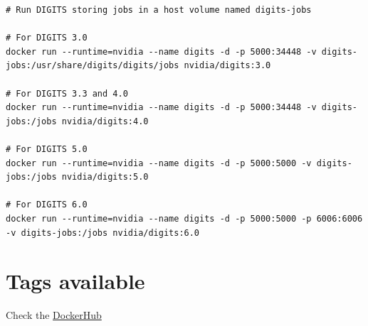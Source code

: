 \begin{lstlisting}
# Run DIGITS storing jobs in a host volume named digits-jobs

# For DIGITS 3.0
docker run --runtime=nvidia --name digits -d -p 5000:34448 -v digits-jobs:/usr/share/digits/digits/jobs nvidia/digits:3.0

# For DIGITS 3.3 and 4.0
docker run --runtime=nvidia --name digits -d -p 5000:34448 -v digits-jobs:/jobs nvidia/digits:4.0

# For DIGITS 5.0
docker run --runtime=nvidia --name digits -d -p 5000:5000 -v digits-jobs:/jobs nvidia/digits:5.0

# For DIGITS 6.0
docker run --runtime=nvidia --name digits -d -p 5000:5000 -p 6006:6006 -v digits-jobs:/jobs nvidia/digits:6.0
\end{lstlisting}

\section{Tags available}

Check the \href{https://hub.docker.com/r/nvidia/digits/}{DockerHub}
